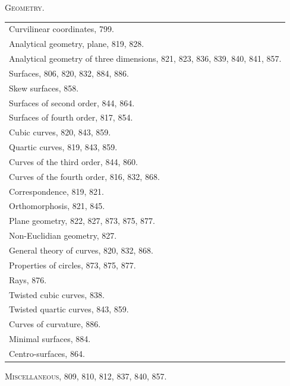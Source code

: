 \documentclass[11pt,a4paper]{article}
\theoremstyle{definition}
\theoremstyle{remark}
\begin{document}
\begin{center}
\textsc{Geometry.}
\end{center}
\begin{center}
\begin{tabular}{p{12cm}}
Curvilinear coordinates, 799.\\
Analytical geometry, plane, 819, 828.\\
Analytical geometry of three dimensions, 821, 823, 836, 839, 840, 841, 857.\\
Surfaces, 806, 820, 832, 884, 886.\\
Skew surfaces, 858.\\
Surfaces of second order, 844, 864.\\
Surfaces of fourth order, 817, 854.\\
Cubic curves, 820, 843, 859.\\
Quartic curves, 819, 843, 859.\\
Curves of the third order, 844, 860.\\
Curves of the fourth order, 816, 832, 868.\\
Correspondence, 819, 821.\\
Orthomorphosis, 821, 845.\\
Plane geometry, 822, 827, 873, 875, 877.\\
Non-Euclidian geometry, 827.\\
General theory of curves, 820, 832, 868.\\
Properties of circles, 873, 875, 877.\\
Rays, 876.\\
Twisted cubic curves, 838.\\
Twisted quartic curves, 843, 859.\\
Curves of curvature, 886.\\
Minimal surfaces, 884.\\
Centro-surfaces, 864.\\
\end{tabular}
\end{center}

\begin{center}
\textsc{Miscellaneous,} 809, 810, 812, 837, 840, 857.
\end{center}
\cleardoublepage

\setcounter{page}{1}

\end{document}
